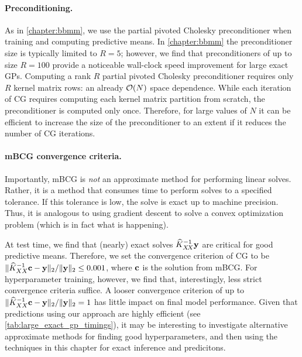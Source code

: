 \paragraph{Preconditioning.}
As in \cref{chapter:bbmm}, we use the partial pivoted Cholesky preconditioner when training and computing predictive means.
In \cref{chapter:bbmm} the preconditioner size is typically limited to $R=5$; however, we find that preconditioners of up to size $R=100$ provide a noticeable wall-clock speed improvement for large exact GPs.
Computing a rank $R$ partial pivoted Cholesky preconditioner requires only $R$ kernel matrix rows: an already $\bigo{N}$ space dependence.
While each iteration of CG requires computing each kernel matrix partition from scratch, the preconditioner is computed only once.
Therefore, for large values of $N$ it can be efficient to increase the size of the preconditioner to an extent if it reduces the number of CG iterations.


\paragraph{mBCG convergence criteria.}
Importantly, mBCG is \emph{not} an approximate method for performing linear solves.
Rather, it is a method that consumes time to perform solves to a specified tolerance.
If this tolerance is low, the solve is exact up to machine precision.
Thus, it is analogous to using gradient descent to solve a convex optimization problem (which is in fact what is happening).

At test time, we find that (nearly) exact solves $\widehat {K}_{X \! X}^{-1} \mathbf{y}$  are critical for good predictive means.
Therefore, we set the convergence criterion of CG to be $\Vert \widehat{K}_{XX}^{-1} \mathbf{c} - \mathbf{y} \Vert_2 / \Vert \mathbf{y} \Vert_2 \leq 0.001$, where $\mathbf{c}$ is the solution from mBCG.
For hyperparameter training, however, we find that, interestingly, less strict convergence criteria suffice.
A looser convergence criterion of up to $\Vert \widehat{K}_{XX}^{-1} \mathbf{c} - \mathbf{y} \Vert_2 / \Vert \mathbf{y} \Vert_2 = 1$ has little impact on final model performance.
Given that predictions using our approach are highly efficient (see \cref{tab:large_exact_gp_timings}), it may be interesting to investigate alternative approximate methods for finding good hyperparameters, and then using the techniques in this chapter for exact inference and predicitons.

